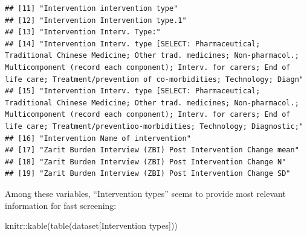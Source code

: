 \documentclass[
]{article}
\newenvironment{Shaded}{\begin{snugshade}}{\end{snugshade}}
\newcommand{\FunctionTok}[1]{\textcolor[rgb]{0.00,0.00,0.00}{#1}}
\newcommand{\NormalTok}[1]{#1}
\newcommand{\SpecialCharTok}[1]{\textcolor[rgb]{0.00,0.00,0.00}{#1}}
\newcommand{\StringTok}[1]{\textcolor[rgb]{0.31,0.60,0.02}{#1}}
\begin{document}
\begin{verbatim}
## [11] "Intervention intervention type"                                                                                                                                                                                                                                 
## [12] "Intervention Intervention type.1"                                                                                                                                                                                                                               
## [13] "Intervention Interv. Type:"                                                                                                                                                                                                                                     
## [14] "Intervention Interv. type [SELECT: Pharmaceutical; Traditional Chinese Medicine; Other trad. medicines; Non-pharmacol.; Multicomponent (record each component); Interv. for carers; End of life care; Treatment/prevention of co-morbidities; Technology; Diagn"
## [15] "Intervention Interv. type [SELECT: Pharmaceutical; Traditional Chinese Medicine; Other trad. medicines; Non-pharmacol.; Multicomponent (record each component); Interv. for carers; End of life care; Treatment/preventioo-morbidities; Technology; Diagnostic;"
## [16] "Intervention Name of intervention"                                                                                                                                                                                                                              
## [17] "Zarit Burden Interview (ZBI) Post Intervention Change mean"                                                                                                                                                                                                     
## [18] "Zarit Burden Interview (ZBI) Post Intervention Change N"                                                                                                                                                                                                        
## [19] "Zarit Burden Interview (ZBI) Post Intervention Change SD"
\end{verbatim}

Among these variables, ``Intervention types'' seems to provide most
relevant information for fast screening:

\begin{Shaded}
\begin{Highlighting}[]
\NormalTok{knitr}\SpecialCharTok{::}\FunctionTok{kable}\NormalTok{(}\FunctionTok{table}\NormalTok{(dataset[}\StringTok{\textquotesingle{}Intervention types\textquotesingle{}}\NormalTok{]))}
\end{Highlighting}
\end{Shaded}
\end{document}
